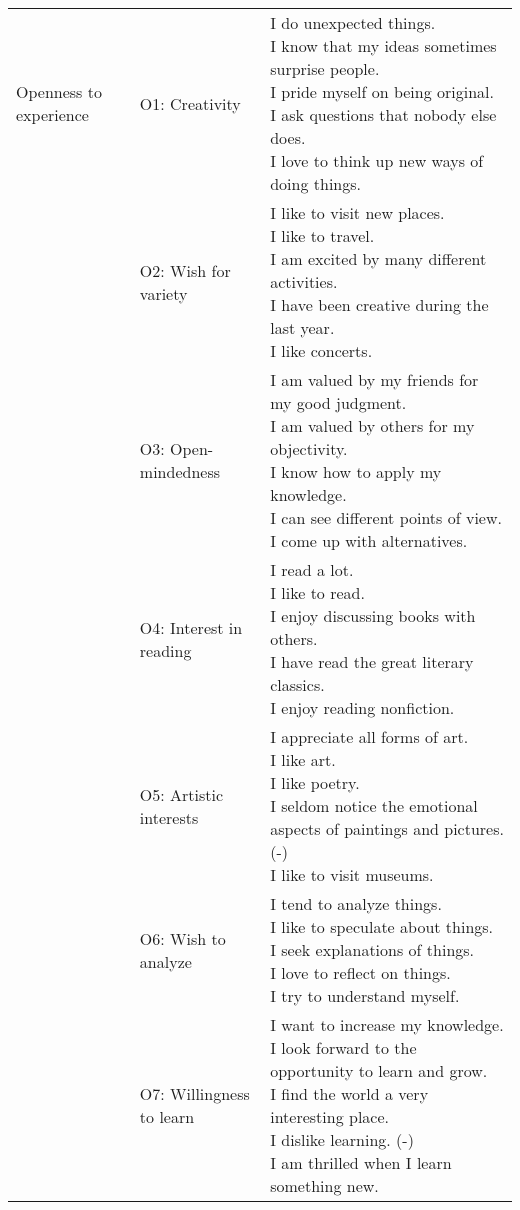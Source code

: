 \documentclass[]{article}
\begin{document}
\begin{longtable}[t]{lll}
\addlinespace
Openness to experience & O1: Creativity & \makecell[l]{I do unexpected things.\\I know that my ideas sometimes surprise people.\\I pride myself on being original.\\I ask questions that nobody else does.\\I love to think up new ways of doing things.}\\
\addlinespace
 & O2: Wish for variety & \makecell[l]{I like to visit new places.\\I like to travel.\\I am excited by many different activities.\\I have been creative during the last year.\\I like concerts.}\\
\addlinespace
 & O3: Open-mindedness & \makecell[l]{I am valued by my friends for my good judgment.\\I am valued by others for my objectivity.\\I know how to apply my knowledge.\\I can see different points of view.\\I come up with alternatives.}\\
\addlinespace
 & O4: Interest in reading & \makecell[l]{I read a lot.\\I like to read.\\I enjoy discussing books with others.\\I have read the great literary classics.\\I enjoy reading nonfiction.}\\
\addlinespace
 & O5: Artistic interests & \makecell[l]{I appreciate all forms of art.\\I like art.\\I like poetry.\\I seldom notice the emotional aspects of paintings and pictures. (-)\\I like to visit museums.}\\
\addlinespace
 & O6: Wish to analyze & \makecell[l]{I tend to analyze things.\\I like to speculate about things.\\I seek explanations of things.\\I love to reflect on things.\\I try to understand myself.}\\
\addlinespace
 & O7: Willingness to learn & \makecell[l]{I want to increase my knowledge.\\I look forward to the opportunity to learn and grow.\\I find the world a very interesting place.\\I dislike learning. (-)\\I am thrilled when I learn something new.}\\

\end{longtable}
\end{document}
